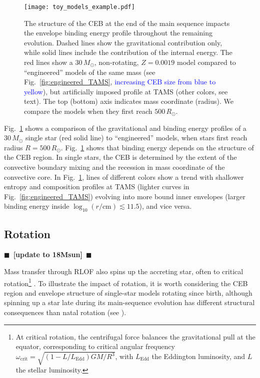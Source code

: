 \documentclass[twocolumn,twocolappendix,trackchanges]{aastex63}
\DeclareRobustCommand{\Figref}[1]{Fig.~\ref{#1}}
\newcommand{\todo}[1]{{\large $\blacksquare$~\textbf{\color{red}[#1]}}~$\blacksquare$}
\begin{document}
\begin{figure}[htbp]
  \centering
  \texttt{[image: toy\_models\_example.pdf]}
  \caption{The structure of the CEB at the end of the main sequence
    impacts the envelope binding energy profile throughout the
    remaining evolution. Dashed lines show the gravitational
    contribution only, while solid lines include the contribution of
    the internal energy. The red lines show a $30\,M_\odot$,
    non-rotating, $Z=0.0019$ model compared to ``engineered'' models
    of the same mass (see \Figref{fig:engineered_TAMS},
    \textcolor{blue}{increasing CEB size from blue to yellow}), but
    artificially imposed profile at TAMS (other colors, see text). The
    top (bottom) axis indicates mass coordinate (radius). We compare
    the models when they first reach $500\,R_\odot$.}
  \label{fig:toy_models_example}
\end{figure}


\Figref{fig:toy_models_example} shows a comparison of the
gravitational and binding energy profiles of a $30\,M_\odot$ single
star (red solid line) to
``engineered'' models, when stars first
reach radius $R=500\,R_\odot$.
\Figref{fig:toy_models_example} shows that
binding energy depends on the structure of the CEB region. In single
stars, the CEB is determined by the extent of the convective boundary
mixing and the recession in mass coordinate of the
convective core. In \Figref{fig:toy_models_example}, lines of
different colors show a trend with shallower entropy and composition
profiles at TAMS (lighter curves in \Figref{fig:engineered_TAMS})
evolving into more bound inner envelopes (larger
binding energy inside $\log_{10}(r/\mathrm{cm})\lesssim 11.5$), and
vice versa.

\subsection{Rotation}
\label{sec:rot_examples}
\todo{update to 18Msun}


Mass transfer through RLOF also spins up the accreting star, often to
critical rotation\footnote{At critical rotation, the centrifugal force
  balances the gravitational pull at the equator, corresponding to
  critical angular frequency
  $\omega_\mathrm{crit}=\sqrt{(1-L/L_\mathrm{Edd})GM/R^3}$, with
  $L_\mathrm{Edd}$ the Eddington luminosity, and $L$ the stellar
  luminosity.} \citep[e.g.,][]{lubow:1975, packet:1981,
  cantiello:2007}. To illustrate the
  impact of rotation, it is worth considering the CEB
 region and envelope structure
 of single-star models rotating since
birth, although spinning up a star late during its
main-sequence evolution has different structural consequences than
natal rotation (see \citealt{renzo:2021zoph}).
\end{document}
